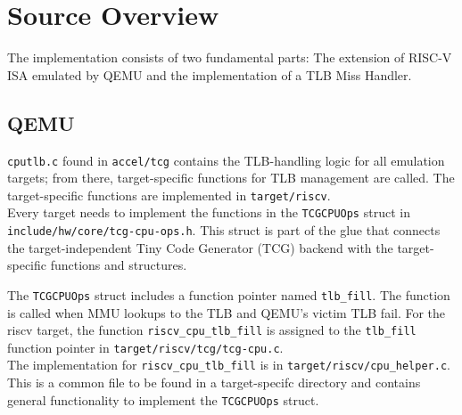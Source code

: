 \section{Source Overview}
The implementation consists of two fundamental parts:
The extension of RISC-V ISA emulated by QEMU and the implementation of a
TLB Miss Handler.


\subsection{QEMU}
\texttt{cputlb.c} found in \texttt{accel/tcg} contains the TLB-handling logic for all
emulation targets; from there, target-specific functions for TLB management are called.
The target-specific functions are implemented in \texttt{target/riscv}.\\
Every target needs to implement the functions in the \texttt{TCGCPUOps} struct in
\texttt{include/hw/core/tcg-cpu-ops.h}. This struct is part of the glue that connects the target-independent
Tiny Code Generator (TCG) backend with the target-specific functions and structures.




The \texttt{TCGCPUOps} struct includes a function pointer named \texttt{tlb\_fill}. The function is called
when MMU lookups to the TLB and QEMU's victim TLB fail.
For the riscv target, the function \texttt{riscv\_cpu\_tlb\_fill} is assigned to the \texttt{tlb\_fill}
function pointer in \texttt{target/riscv/tcg/tcg-cpu.c}.\\
The implementation for \texttt{riscv\_cpu\_tlb\_fill} is in \texttt{target/riscv/cpu\_helper.c}. This is a common
file to be found in a target-specifc directory and contains general functionality to implement the \texttt{TCGCPUOps} struct.\\


